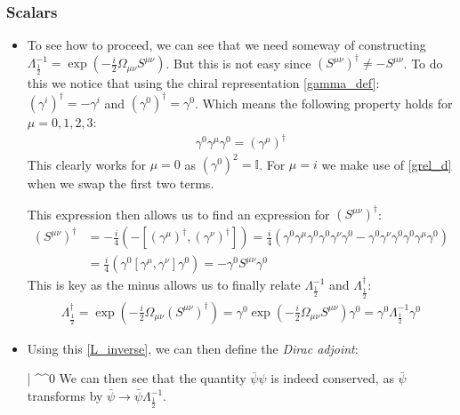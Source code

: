 \documentclass[11pt]{article}
\renewenvironment{flalign}{\vspace{-3mm}\empheq[box=\tcbhighmath]{align}}{\endempheq}
\numberwithin{equation}{section}
\begin{document}
  \subsubsection{Scalars}
  \begin{itemize}
    \item To see how to proceed, we can see that we need someway of constructing $\Lambda^{-1}_{\frac{1}{2}} =  \exp(-\frac{i}{2}\Omega_{\mu\nu}S^{\mu\nu})$. But this is not easy since $(S^{\mu\nu})^{\dagger} \neq - S^{\mu\nu}$. To do this we notice that using the chiral representation \ref{gamma_def}: $(\gamma^{i})^{\dagger} = -\gamma^{i}$ and $(\gamma^{0})^{\dagger} = \gamma^{0}$. Which means the following property holds for $\mu = 0,1,2,3$:
    \begin{align*}
      \gamma^{0}\gamma^{\mu}\gamma^{0} = (\gamma^{\mu})^{\dagger}
    \end{align*}
    This clearly works for $\mu=0$ as $(\gamma^{0})^2= \mathbb{I}$. For $\mu = i$ we make use of \ref{grel_d} when we swap the first two terms. 

    This expression then allows us to find an expression for $(S^{\mu\nu})^{\dagger}$:
    \begin{align*}
      (S^{\mu\nu})^{\dagger} & = -\frac{i}{4}(-[(\gamma^{\mu})^{\dagger},(\gamma^{\nu})^{\dagger}]) = \frac{i}{4}\left(\gamma^{0}\gamma^{\mu}\gamma^{0}\gamma^{0}\gamma^{\nu}\gamma^{0}-\gamma^{0}\gamma^{\nu}\gamma^{0}\gamma^{0}\gamma^{\mu}\gamma^{0}\right) \\
        & = \frac{i}{4}\left(\gamma^{0}[\gamma^{\mu},\gamma^{\nu}]\gamma^{0}\right) = -\gamma^{0}S^{\mu\nu}\gamma^{0}
    \end{align*}
    This is key as the minus allows us to finally relate $\Lambda^{-1}_{\frac{1}{2}}$ and $\Lambda^{\dagger}_{\frac{1}{2}}$:
    \begin{align}
    \label{L_inverse}
       \Lambda^{\dagger}_{\frac{1}{2}} = \exp(-\frac{i}{2}\Omega_{\mu\nu}(S^{\mu\nu})^{\dagger}) = \gamma^{0}\exp(-\frac{i}{2}\Omega_{\mu\nu}S^{\mu\nu})\gamma^{0} = \gamma^{0}\Lambda^{-1}_{\frac{1}{2}}\gamma^{0}
     \end{align} 
     \item Using this \ref{L_inverse}, we can then define the \emph{Dirac adjoint}:

     \begin{flalign}
       \label{adjoint}
        \bar{\psi} \equiv \psi^{\dagger}\gamma^{0} 
     \end{flalign}
     We can then see that the quantity $\bar{\psi}\psi$ is indeed conserved, as $\bar{\psi}$ transforms by $\bar{\psi} \rightarrow \bar{\psi}\Lambda^{-1}_{\frac{1}{2}}$.   
\end{itemize}
\end{document}

